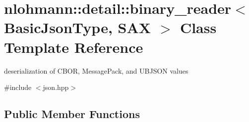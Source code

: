 \hypertarget{classnlohmann_1_1detail_1_1binary__reader}{}\section{nlohmann\+::detail\+::binary\+\_\+reader$<$ Basic\+Json\+Type, S\+AX $>$ Class Template Reference}
\label{classnlohmann_1_1detail_1_1binary__reader}


deserialization of C\+B\+OR, Message\+Pack, and U\+B\+J\+S\+ON values  




{\ttfamily \#include $<$json.\+hpp$>$}

\subsection*{Public Member Functions}
